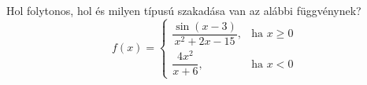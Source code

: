 \documentclass[11pt]{scrartcl}
\begin{document}
Hol folytonos, hol és milyen típusú szakadása van az alábbi függvénynek?
\[
	f(x) = \begin{cases}
		\dfrac{\sin(x - 3)}{x^2 + 2x - 15}, & \text{ha } x \ge 0 \\[2ex]
		\dfrac{4x^2}{x + 6},               & \text{ha } x < 0
	\end{cases}
\]
\end{document}
